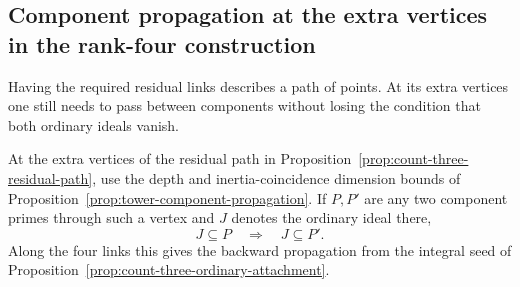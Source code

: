 \subsection{Component propagation at the extra vertices in the rank-four construction}
\label{sec:count-three-components}

Having the required residual links describes a path of points. At its extra vertices one still needs to pass between components without losing the condition that both ordinary ideals vanish.

\begin{proposition}\label{prop:count-three-extra-vertices}
At the extra vertices of the residual path in
Proposition~\ref{prop:count-three-residual-path}, use the
depth and inertia-coincidence dimension bounds of
Proposition~\ref{prop:tower-component-propagation}. If \(P,P'\) are any two component primes through such a vertex and \(J\) denotes the ordinary ideal there, 
\[
 J\subseteq P\quad\Longrightarrow\quad J\subseteq P'.
\]
 Along the
four links this gives the backward propagation from the integral
seed of Proposition~\ref{prop:count-three-ordinary-attachment}.
\end{proposition}

